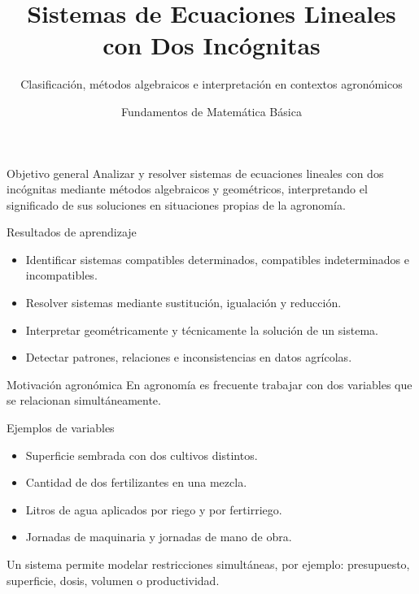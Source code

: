 \documentclass[aspectratio=169]{beamer}
\title[Sistemas de ecuaciones lineales]{Sistemas de Ecuaciones Lineales con Dos Incógnitas}
\subtitle{Clasificación, métodos algebraicos e interpretación en contextos agronómicos}
\author{Fundamentos de Matemática Básica}
\institute{Universidad Santo Tomás}
\date{}
\begin{document}
	
\begin{frame}
	\titlepage
\end{frame}

\begin{frame}{Objetivo general}
	Analizar y resolver sistemas de ecuaciones lineales con dos incógnitas mediante métodos algebraicos y geométricos, interpretando el significado de sus soluciones en situaciones propias de la agronomía.
	
	\bigskip
	
	\begin{block}{Resultados de aprendizaje}
		\begin{itemize}
			\item Identificar sistemas compatibles determinados, compatibles indeterminados e incompatibles.
			\item Resolver sistemas mediante sustitución, igualación y reducción.
			\item Interpretar geométricamente y técnicamente la solución de un sistema.
			\item Detectar patrones, relaciones e inconsistencias en datos agrícolas.
		\end{itemize}
	\end{block}
\end{frame}

\begin{frame}{Motivación agronómica}
	En agronomía es frecuente trabajar con dos variables que se relacionan simultáneamente.
	
	\bigskip
	
	\begin{block}{Ejemplos de variables}
		\begin{itemize}
			\item Superficie sembrada con dos cultivos distintos.
			\item Cantidad de dos fertilizantes en una mezcla.
			\item Litros de agua aplicados por riego y por fertirriego.
			\item Jornadas de maquinaria y jornadas de mano de obra.
		\end{itemize}
	\end{block}
	
	\bigskip
	
	Un sistema permite modelar restricciones simultáneas, por ejemplo: presupuesto, superficie, dosis, volumen o productividad.
\end{frame}
	
\end{document}
